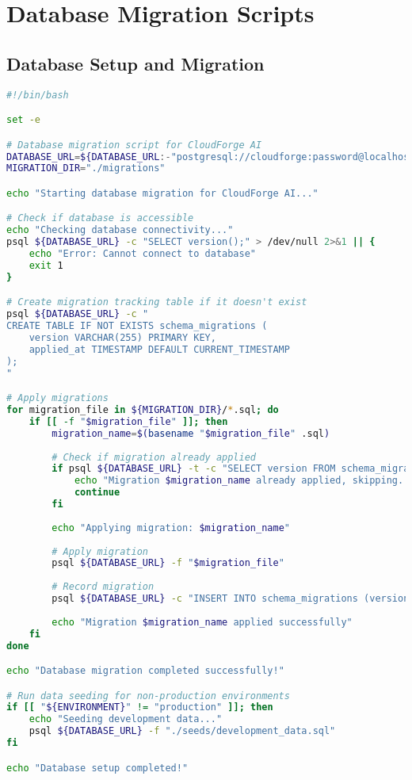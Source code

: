 \section{Database Migration Scripts}

\subsection{Database Setup and Migration}

\begin{lstlisting}[language=bash]
#!/bin/bash

set -e

# Database migration script for CloudForge AI
DATABASE_URL=${DATABASE_URL:-"postgresql://cloudforge:password@localhost:5432/cloudforge"}
MIGRATION_DIR="./migrations"

echo "Starting database migration for CloudForge AI..."

# Check if database is accessible
echo "Checking database connectivity..."
psql ${DATABASE_URL} -c "SELECT version();" > /dev/null 2>&1 || {
    echo "Error: Cannot connect to database"
    exit 1
}

# Create migration tracking table if it doesn't exist
psql ${DATABASE_URL} -c "
CREATE TABLE IF NOT EXISTS schema_migrations (
    version VARCHAR(255) PRIMARY KEY,
    applied_at TIMESTAMP DEFAULT CURRENT_TIMESTAMP
);
"

# Apply migrations
for migration_file in ${MIGRATION_DIR}/*.sql; do
    if [[ -f "$migration_file" ]]; then
        migration_name=$(basename "$migration_file" .sql)
        
        # Check if migration already applied
        if psql ${DATABASE_URL} -t -c "SELECT version FROM schema_migrations WHERE version = '$migration_name';" | grep -q "$migration_name"; then
            echo "Migration $migration_name already applied, skipping..."
            continue
        fi
        
        echo "Applying migration: $migration_name"
        
        # Apply migration
        psql ${DATABASE_URL} -f "$migration_file"
        
        # Record migration
        psql ${DATABASE_URL} -c "INSERT INTO schema_migrations (version) VALUES ('$migration_name');"
        
        echo "Migration $migration_name applied successfully"
    fi
done

echo "Database migration completed successfully!"

# Run data seeding for non-production environments
if [[ "${ENVIRONMENT}" != "production" ]]; then
    echo "Seeding development data..."
    psql ${DATABASE_URL} -f "./seeds/development_data.sql"
fi

echo "Database setup completed!"
\end{lstlisting}